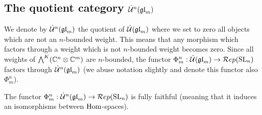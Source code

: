 \documentclass[10pt,leqno]{article}
\begin{document}
\subsection{The quotient category $\dot{{\mathcal{U}}}^n({\mathfrak{gl}}_m)$}

We denote by $\dot{{\mathcal{U}}}^n({\mathfrak{gl}}_m)$ the quotient of $\dot{{\mathcal{U}}}({\mathfrak{gl}}_m)$ where we set to zero all objects which are not an $n$-bounded weight. This means that any morphism which factors through a weight which is not $n$-bounded weight becomes zero. Since all weights of $\bigwedge^K(\mathbb{C}^n \otimes \mathbb{C}^m)$ are $ n$-bounded, the functor $\Phi_m^n: \dot{{\mathcal{U}}}({\mathfrak{gl}}_m)\rightarrow \mathcal{R}ep({\rm{SL}}_n)$ factors through $\dot{{\mathcal{U}}}^n({\mathfrak{gl}}_m)$ (we abuse notation slightly and denote this functor also $\Phi_m^n$).

\begin{thm}\label{th:functorfullyfaithful}
The functor $\Phi_m^n: \dot{{\mathcal{U}}}^n({\mathfrak{gl}}_m) \rightarrow \mathcal{R}ep({\rm{SL}}_n)$ is fully faithful (meaning that it induces an isomorphisms between $\operatorname{Hom}$-spaces).
\end{thm}
\end{document}
